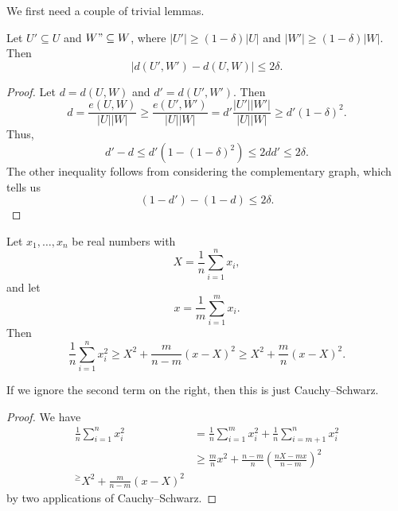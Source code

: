 \documentclass[a4paper]{article}
\begin{document}
We first need a couple of trivial lemmas.
\begin{lemma}
  Let $U' \subseteq U$ and $W" \subseteq W$, where $|U'| \geq (1 - \delta)|U|$ and $|W'| \geq (1 - \delta) |W|$. Then
  \[
    |d(U', W') - d(U, W)| \leq 2\delta.
  \]
\end{lemma}

\begin{proof}
  Let $d = d(U, W)$ and $d' = d(U', W')$. Then
  \[
    d = \frac{e(U, W)}{|U||W|} \geq \frac{e(U', W')}{|U||W|} = d' \frac{|U'||W'|}{|U||W|} \geq d' (1 - \delta)^2.
  \]
  Thus,
  \[
    d' - d \leq d'(1 - (1 - \delta)^2) \leq 2d d' \leq 2 \delta.
  \]
  The other inequality follows from considering the complementary graph, which tells us
  \[
    (1 - d') - (1 - d) \leq 2\delta.
  \]
\end{proof}

\begin{lemma}
  Let $x_1, \ldots, x_n$ be real numbers with
  \[
    X = \frac{1}{n} \sum_{i = 1}^n x_i,
  \]
  and let
  \[
    x = \frac{1}{m} \sum_{i = 1}^m x_i.
  \]
  Then
  \[
    \frac{1}{n} \sum_{i = 1}^n x_i^2 \geq X^2 + \frac{m}{n - m}(x - X)^2 \geq X^2 + \frac{m}{n} (x - X)^2.
  \]
\end{lemma}
If we ignore the second term on the right, then this is just Cauchy--Schwarz.

\begin{proof}
  We have
  \begin{align*}
    \frac{1}{n} \sum_{i = 1}^n x_i^2 &= \frac{1}{n} \sum_{i = 1}^m x_i^2 + \frac{1}{n} \sum_{i = m + 1}^n x_i^2 \\
    &\geq \frac{m}{n} x^2 + \frac{n - m}{n} \left(\frac{nX - mx}{n - m}\right)^2\\
    ^\geq X^2 + \frac{m}{n - m} (x - X)^2
  \end{align*}
  by two applications of Cauchy--Schwarz.
\end{proof}
\end{document}
